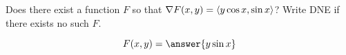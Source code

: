 \documentclass{ximera}
\author{David Guichard \and Neal Koblitz \and H. Jerome Keisler \and Albert Scheller \and Barry Balof \and Mike Wills \and Matthew Carr}
\begin{document}
\begin{exercise}




Does there exist a function $F$ so that $\nabla F(x,y)=\left\langle y\cos x,\sin x\right\rangle$? Write DNE if there exists no such $F$. 

\begin{prompt}
\[
F(x,y)=\answer{y\sin x}
\]
\end{prompt}
\end{exercise}
\end{document}
